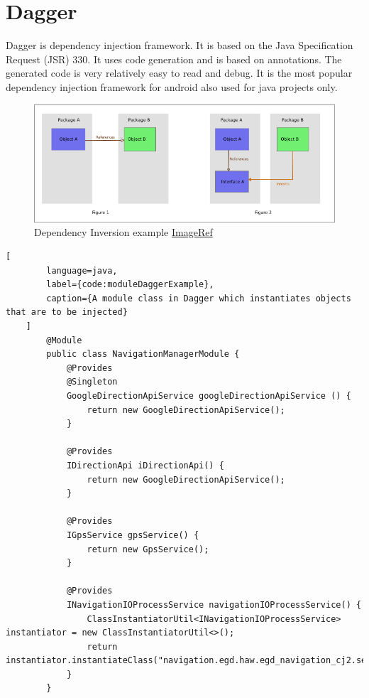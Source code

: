 \newpage
    \section{Dagger}
        \label{appendix:dagger}
        Dagger is dependency injection framework. It is based on the 
        Java Specification Request (JSR) 330. 
        It uses code generation and is based 
        on annotations. The generated code is very relatively easy to read 
        and debug. It is the most popular dependency injection framework
        for android also used for java projects only.

        
    \begin{figure}[htbp!]
        \centering \includegraphics[scale=0.85]{grafiken/di.jpg}
        \caption{Dependency Inversion example
        \href{https://upload.wikimedia.org/wikipedia/commons/9/96/Dependency_inversion.png}{ImageRef}}
        \label{fig:DIExample}
    \end{figure}

    \newpage
    \begin{lstlisting}[
        language=java,
        label={code:moduleDaggerExample},
        caption={A module class in Dagger which instantiates objects that are to be injected}
    ]
        @Module
        public class NavigationManagerModule {
            @Provides
            @Singleton
            GoogleDirectionApiService googleDirectionApiService () {
                return new GoogleDirectionApiService();
            }

            @Provides
            IDirectionApi iDirectionApi() {
                return new GoogleDirectionApiService();
            }

            @Provides
            IGpsService gpsService() {
                return new GpsService();
            }

            @Provides
            INavigationIOProcessService navigationIOProcessService() {
                ClassInstantiatorUtil<INavigationIOProcessService> instantiator = new ClassInstantiatorUtil<>();
                return instantiator.instantiateClass("navigation.egd.haw.egd_navigation_cj2.services.NavigationIOServices.NavigationIOProcessService");
            }
        }
    \end{lstlisting}

